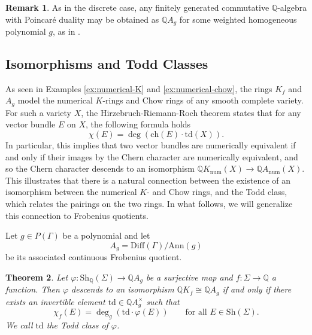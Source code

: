 \documentclass[oneside]{amsart}
\theoremstyle{plain}
\newtheorem{theorem}{Theorem}[section]
\theoremstyle{definition}
\newtheorem{remark}[theorem]{Remark}
\newcommand{\Q}{{\mathbb{Q}}}
\newcommand{\Ann}{{\mathrm{Ann}}}
\newcommand{\Diff}{{\mathrm{Diff}}}
\newcommand{\Sh}{{\mathrm{Sh}}}
\newcommand{\ch}{{\mathrm{ch}}}
\newcommand{\td}{{\mathrm{td}}}
\newcommand{\num}{{\mathrm{num}}}
\begin{document}
\begin{remark}
    As in the discrete case, any finitely generated commutative $\Q$-algebra with Poincar\'e duality may be obtained as $\Q A_g$ for some weighted homogeneous polynomial $g$, as in .
\end{remark}

\subsection{Isomorphisms and Todd Classes}

As seen in Examples \ref{ex:numerical-K} and \ref{ex:numerical-chow}, the rings $K_f$ and $A_g$ model the numerical $K$-rings and Chow rings of any smooth complete variety.
For such a variety $X$, the Hirzebruch-Riemann-Roch theorem states that for any vector bundle $E$ on $X$, the following formula holds
\[\chi(E) = \deg(\ch(E) \cdot \td(X)).\]
In particular, this implies that two vector bundles are numerically equivalent if and only if their images by the Chern character are numerically equivalent, and so the Chern character descends to an isomorphism $\Q K_\num(X) \to \Q A_\num(X)$. This illustrates that there is a natural connection between the existence of an isomorphism between the numerical $K$- and Chow rings, and the Todd class, which relates the pairings on the two rings. In what follows, we will generalize this connection to Frobenius quotients.

Let $g\in P(\Gamma)$ be a polynomial and let
\[A_g = \Diff(\Gamma)/\Ann(g)\]
be its associated continuous Frobenius quotient.


\begin{theorem}
\label{thm:map-descends-iff-hrr}
    Let $\varphi: \Sh_\Q(\Sigma) \to \Q A_g$ be a surjective map and $f: \Sigma \to \Q$ a function. Then $\varphi$ descends to an 
    isomorphism $\Q K_f \cong \Q A_g$ if and only if there exists an invertible element
    $\td \in \Q A_g^\times$ such that
    \begin{equation}
    \label{eq:hrr}
        \chi_f(E) = \deg_g(\td \cdot \varphi(E))\qquad\textrm{for all }E \in \Sh(\Sigma).
    \end{equation}
    We call $\td$ the \emph{Todd class} of $\varphi$.
\end{theorem}
\end{document}
